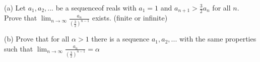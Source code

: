 (a) Let $a_1,a_2,...$ be a sequenceof reals with $a_1=1$ and $a_{n+1}>\frac32 a_n$ for all $n$. Prove that $\lim_{n\rightarrow\infty}\frac{a_n}{\left(\frac32\right)^{n-1}}$ exists. (finite or infinite)

(b) Prove that for all $\alpha>1$ there is a sequence $a_1,a_2,...$ with the same properties such that $\lim_{n\rightarrow\infty}\frac{a_n}{\left(\frac32\right)^{n-1}}=\alpha$